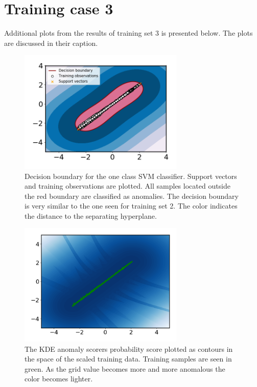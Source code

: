 \chapter{Training case 3}\label{appendix:training_case3}
    Additional plots from the results of training set 3 is presented below. The plots are discussed in their caption.
    \begin{figure}
        \centering
        \includegraphics[width=0.7\textwidth]{report/figures/analysis/plant2_train_long/svm_boundary.png}
        \caption{Decision boundary for the one class SVM classifier. Support vectors and training observations are plotted. All samples located outside the red boundary are classified as anomalies. The decision boundary is very similar to the one seen for training set 2. The color indicates the distance to the separating hyperplane.}
    \end{figure}
    
    
     \begin{figure}
        \centering
        \includegraphics[width=0.7\textwidth]{report/figures/analysis/plant2_train_long/kde_boundary.png}
        \caption{The KDE anomaly scorers probability score plotted as contours in the space of the scaled training data. Training samples are seen in green. As the grid value becomes more and more anomalous the color becomes lighter.}
        \label{fig:my_label}
    \end{figure}
    
